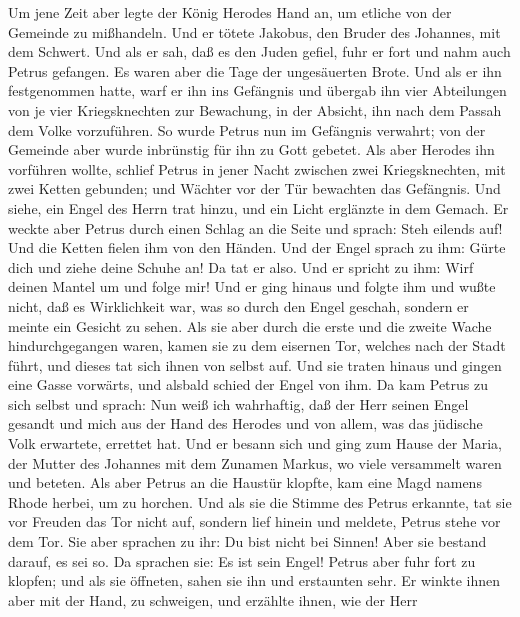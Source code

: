  Um jene Zeit aber legte der König Herodes Hand an, um
etliche von der Gemeinde zu mißhandeln.  Und er tötete
Jakobus, den Bruder des Johannes, mit dem Schwert.  Und
als er sah, daß es den Juden gefiel, fuhr er fort und nahm auch Petrus
gefangen. Es waren aber die Tage der ungesäuerten Brote. 
Und als er ihn festgenommen hatte, warf er ihn ins Gefängnis und übergab
ihn vier Abteilungen von je vier Kriegsknechten zur Bewachung, in der
Absicht, ihn nach dem Passah dem Volke vorzuführen.  So
wurde Petrus nun im Gefängnis verwahrt; von der Gemeinde aber wurde
inbrünstig für ihn zu Gott gebetet.  Als aber Herodes ihn
vorführen wollte, schlief Petrus in jener Nacht zwischen zwei
Kriegsknechten, mit zwei Ketten gebunden; und Wächter vor der Tür
bewachten das Gefängnis.  Und siehe, ein Engel des Herrn
trat hinzu, und ein Licht erglänzte in dem Gemach. Er weckte aber Petrus
durch einen Schlag an die Seite und sprach: Steh eilends auf! Und die
Ketten fielen ihm von den Händen.  Und der Engel sprach zu
ihm: Gürte dich und ziehe deine Schuhe an! Da tat er also. Und er
spricht zu ihm: Wirf deinen Mantel um und folge mir!  Und
er ging hinaus und folgte ihm und wußte nicht, daß es Wirklichkeit war,
was so durch den Engel geschah, sondern er meinte ein Gesicht zu sehen.
 Als sie aber durch die erste und die zweite Wache
hindurchgegangen waren, kamen sie zu dem eisernen Tor, welches nach der
Stadt führt, und dieses tat sich ihnen von selbst auf. Und sie traten
hinaus und gingen eine Gasse vorwärts, und alsbald schied der Engel von
ihm.  Da kam Petrus zu sich selbst und sprach: Nun weiß
ich wahrhaftig, daß der Herr seinen Engel gesandt und mich aus der Hand
des Herodes und von allem, was das jüdische Volk erwartete, errettet
hat.  Und er besann sich und ging zum Hause der Maria,
der Mutter des Johannes mit dem Zunamen Markus, wo viele versammelt
waren und beteten.  Als aber Petrus an die Haustür
klopfte, kam eine Magd namens Rhode herbei, um zu horchen.
 Und als sie die Stimme des Petrus erkannte, tat sie vor
Freuden das Tor nicht auf, sondern lief hinein und meldete, Petrus stehe
vor dem Tor.  Sie aber sprachen zu ihr: Du bist nicht bei
Sinnen! Aber sie bestand darauf, es sei so. Da sprachen sie: Es ist sein
Engel!  Petrus aber fuhr fort zu klopfen; und als sie
öffneten, sahen sie ihn und erstaunten sehr.  Er winkte
ihnen aber mit der Hand, zu schweigen, und erzählte ihnen, wie der Herr
